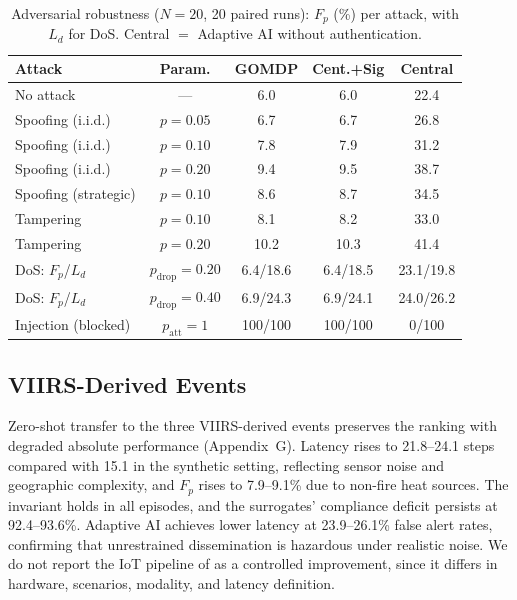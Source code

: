 \documentclass[letterpaper]{article} %
\newcommand{\appVIIRS}{G}
\begin{document}
\begin{table}[!t]
\caption{Adversarial robustness ($N{=}20$, 20 paired runs): $F_p$ (\%) per attack, with $L_d$ for DoS. Central $=$ Adaptive AI without authentication.}
\label{tab:adversarial}
\centering
\setlength{\tabcolsep}{2pt}
\footnotesize
\begin{tabular}{@{}lcccc@{}}
\toprule
\textbf{Attack} & \textbf{Param.} & \textbf{GOMDP} & \textbf{Cent.+Sig} & \textbf{Central} \\
\midrule
No attack & --- & 6.0 & 6.0 & 22.4 \\
Spoofing (i.i.d.) & $p{=}0.05$ & 6.7 & 6.7 & 26.8 \\
Spoofing (i.i.d.) & $p{=}0.10$ & 7.8 & 7.9 & 31.2 \\
Spoofing (i.i.d.) & $p{=}0.20$ & 9.4 & 9.5 & 38.7 \\
Spoofing (strategic) & $p{=}0.10$ & 8.6 & 8.7 & 34.5 \\
Tampering & $p{=}0.10$ & 8.1 & 8.2 & 33.0 \\
Tampering & $p{=}0.20$ & 10.2 & 10.3 & 41.4 \\
DoS: $F_p$/$L_d$ & $p_{\mathrm{drop}}{=}0.20$ & 6.4/18.6 & 6.4/18.5 & 23.1/19.8 \\
DoS: $F_p$/$L_d$ & $p_{\mathrm{drop}}{=}0.40$ & 6.9/24.3 & 6.9/24.1 & 24.0/26.2 \\
Injection (blocked) & $p_{\mathrm{att}}{=}1$ & 100/100 & 100/100 & 0/100 \\
\bottomrule
\end{tabular}
\end{table}

\subsection{VIIRS-Derived Events}
\label{sec:realworld}

Zero-shot transfer to the three VIIRS-derived events preserves the ranking with degraded absolute performance (Appendix~\appVIIRS). Latency rises to 21.8--24.1 steps compared with 15.1 in the synthetic setting, reflecting sensor noise and geographic complexity, and $F_p$ rises to 7.9--9.1\% due to non-fire heat sources. The invariant holds in all episodes, and the surrogates' compliance deficit persists at 92.4--93.6\%. Adaptive AI achieves lower latency at 23.9--26.1\% false alert rates, confirming that unrestrained dissemination is hazardous under realistic noise. We do not report the IoT pipeline of \citet{tarigan2026} as a controlled improvement, since it differs in hardware, scenarios, modality, and latency definition.
\end{document}
